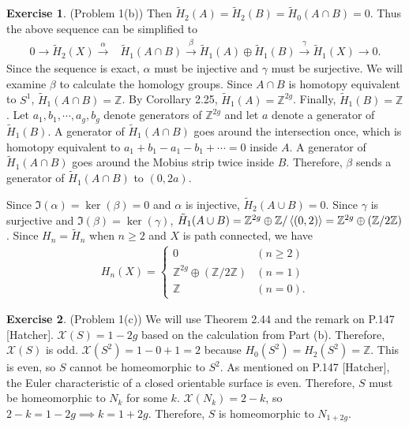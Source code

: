 \documentclass[12pt, psamsfonts]{amsart}
\theoremstyle{definition}
\newtheorem*{exer}{Exercise}
\theoremstyle{remark}
\numberwithin{equation}{section}
\begin{document}
\begin{exer}{(Problem 1(b))}
  Then $\tilde{H}_2(A) = \tilde{H}_2(B) = \tilde{H}_0(A \cap B) = 0$.
  Thus the above sequence can be simplified to 
  \begin{align*}
    0 \rightarrow \tilde{H}_2(X) \xrightarrow{\alpha} &\tilde{H}_1(A \cap B) \xrightarrow{\beta} \tilde{H}_1(A) \oplus \tilde{H}_1(B) \xrightarrow{\gamma} \tilde{H}_1(X) \rightarrow 0.
  \end{align*}
  Since the sequence is exact, $\alpha$ must be injective and $\gamma$ must be surjective.
  We will examine $\beta$ to calculate the homology groups.
  Since $A \cap B$ is homotopy equivalent to $S^1$, $\tilde{H}_1(A \cap B) = \mathbb{Z}$.
  By Corollary 2.25, $\tilde{H}_1(A) = \mathbb{Z}^{2g}$.
  Finally, $\tilde{H}_1(B) = \mathbb{Z}$.
  Let $a_1, b_1, \cdots, a_g, b_g$ denote generators of $\mathbb{Z}^{2g}$ and let $a$ denote a generator of $\tilde{H}_1(B)$.
  A generator of $\tilde{H}_1(A \cap B)$ goes around the intersection once, which is homotopy equivalent to $a_1 + b_1 - a_1 - b_1 + \cdots = 0$ inside $A$.
  A generator of $\tilde{H}_1(A \cap B)$ goes around the Mobius strip twice inside $B$.
  Therefore, $\beta$ sends a generator of $\tilde{H}_1(A \cap B)$ to $(0, 2a)$.

  Since $\Im(\alpha) = \ker(\beta) = 0$ and $\alpha$ is injective, $\tilde{H}_2(A \cup B) = 0$.
  Since $\gamma$ is surjective and $\Im(\beta) = \ker(\gamma)$, $\tilde{H}_1(A \cup B) = \mathbb{Z}^{2g} \oplus \mathbb{Z} / \ev{(0, 2)} = \mathbb{Z}^{2g} \oplus (\mathbb{Z} / 2\mathbb{Z})$.
  Since $H_n = \tilde{H}_n$ when $n \geq 2$ and $X$ is path connected, we have
  \begin{align*}
    H_n(X) = \begin{cases}
      0 & (n \geq 2) \\
      \mathbb{Z}^{2g} \oplus (\mathbb{Z} / 2\mathbb{Z}) & (n = 1) \\
      \mathbb{Z} & (n = 0).
    \end{cases}
  \end{align*}
\end{exer}

\begin{exer}{(Problem 1(c))}
  We will use Theorem 2.44 and the remark on P.147 [Hatcher].
  $\mathcal{X}(S) = 1 - 2g$ based on the calculation from Part (b).
  Therefore, $\mathcal{X}(S)$ is odd.
  $\mathcal{X}(S^2) = 1 - 0 + 1 = 2$ because $H_0(S^2) = H_2(S^2) = \mathbb{Z}$.
  This is even, so $S$ cannot be homeomorphic to $S^2$.
  As mentioned on P.147 [Hatcher], the Euler characteristic of a closed orientable surface is even.
  Therefore, $S$ must be homeomorphic to $N_k$ for some $k$.
  $\mathcal{X}(N_k) = 2 - k$, so $2 - k = 1 - 2g \implies k = 1 + 2g$.
  Therefore, $S$ is homeomorphic to $N_{1 + 2g}$.
\end{exer}
\end{document}
